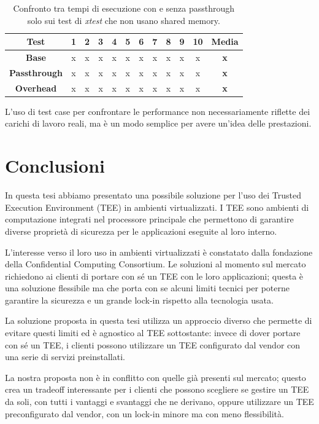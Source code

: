 \documentclass[12pt,italian]{report}
\begin{document}
\begin{table}
    \centering
    \begin{tabular}{|c|c|c|c|c|c|c|c|c|c|c|c|}
        \hline
        \textbf{Test} & 1 & 2 & 3 & 4 & 5 & 6 & 7 & 8 & 9 & 10 & \textbf{Media} \\
        \hline
        \textbf{Base} & x & x & x & x & x & x & x & x & x & x  & \textbf{x} \\
        \hline
        \textbf{Passthrough} & x & x & x & x & x & x & x & x & x & x & \textbf{x} \\
        \hline
        \textbf{Overhead} & x & x & x & x & x & x & x & x & x & x & \textbf{x} \\
        \hline
    \end{tabular}
    \label{tab:performance-no-shmem}
    \caption{
       Confronto tra tempi di esecuzione con e senza passthrough solo
       sui test di \textit{xtest} che non usano shared memory.
    }
\end{table}

L'uso di test case per confrontare le performance non necessariamente
riflette dei carichi di lavoro reali, ma è un modo semplice per avere
un'idea delle prestazioni.

\chapter{Conclusioni}
\label{chap:conclusioni}
In questa tesi abbiamo presentato una possibile soluzione per l'uso dei
Trusted Execution Environment (TEE) in ambienti virtualizzati.
I TEE sono ambienti di computazione integrati nel processore principale
che permettono di garantire diverse proprietà di sicurezza per le
applicazioni eseguite al loro interno.

L'interesse verso il loro uso in ambienti virtualizzati è constatato dalla
fondazione della Confidential Computing Consortium.
Le soluzioni al momento sul mercato richiedono ai clienti di portare con sé
un TEE con le loro applicazioni; questa è una soluzione flessibile ma che
porta con se alcuni limiti tecnici per poterne garantire la sicurezza
e un grande lock-in rispetto alla tecnologia usata.

La soluzione proposta in questa tesi utilizza un approccio diverso che
permette di evitare questi limiti ed è agnostico al TEE sottostante:
invece di dover portare con sé un TEE, i clienti possono utilizzare un TEE
configurato dal vendor con una serie di servizi preinstallati.

La nostra proposta non è in conflitto con quelle già presenti sul mercato;
questo crea un tradeoff interessante per i clienti che possono scegliere
se gestire un TEE da soli, con tutti i vantaggi e svantaggi che ne derivano,
oppure utilizzare un TEE preconfigurato dal vendor, con un lock-in minore
ma con meno flessibilità.
\end{document}
